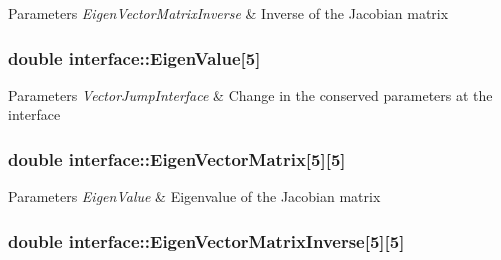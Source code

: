 \begin{DoxyParams}{Parameters}
{\em Eigen\+Vector\+Matrix\+Inverse} & Inverse of the Jacobian matrix \\
\hline
\end{DoxyParams}
\subsubsection[{\texorpdfstring{Eigen\+Value}{EigenValue}}]{\setlength{\rightskip}{0pt plus 5cm}double interface\+::\+Eigen\+Value\mbox{[}5\mbox{]}}\hypertarget{classinterface_a6e63abc816f019315477dc514963c505}{}\label{classinterface_a6e63abc816f019315477dc514963c505}

\begin{DoxyParams}{Parameters}
{\em Vector\+Jump\+Interface} & Change in the conserved parameters at the interface \\
\hline
\end{DoxyParams}
\subsubsection[{\texorpdfstring{Eigen\+Vector\+Matrix}{EigenVectorMatrix}}]{\setlength{\rightskip}{0pt plus 5cm}double interface\+::\+Eigen\+Vector\+Matrix\mbox{[}5\mbox{]}\mbox{[}5\mbox{]}}\hypertarget{classinterface_a5889dedb2a24917fa46bd4c6515a33c7}{}\label{classinterface_a5889dedb2a24917fa46bd4c6515a33c7}

\begin{DoxyParams}{Parameters}
{\em Eigen\+Value} & Eigenvalue of the Jacobian matrix \\
\hline
\end{DoxyParams}
\subsubsection[{\texorpdfstring{Eigen\+Vector\+Matrix\+Inverse}{EigenVectorMatrixInverse}}]{\setlength{\rightskip}{0pt plus 5cm}double interface\+::\+Eigen\+Vector\+Matrix\+Inverse\mbox{[}5\mbox{]}\mbox{[}5\mbox{]}}\hypertarget{classinterface_ae67dd839deeeacfb620b114c560ea0a5}{}\label{classinterface_ae67dd839deeeacfb620b114c560ea0a5}

